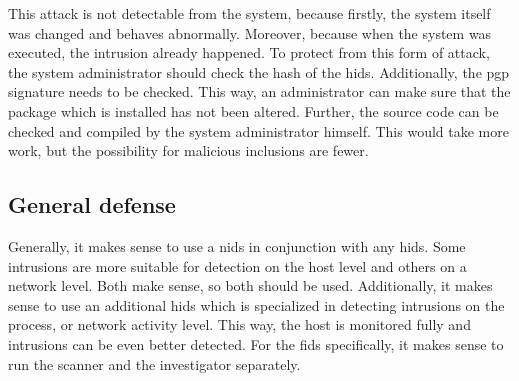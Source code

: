 This attack is not detectable from the system, because firstly, the system itself was changed and behaves abnormally. Moreover, because when the system was executed, the \gls{intrusion} already happened. To protect from this form of attack, the system administrator should check the hash of the \gls{hids}. Additionally, the \gls{pgp} signature needs to be checked. This way, an administrator can make sure that the package which is installed has not been altered. Further, the source code can be checked and compiled by the system administrator himself. This would take more work, but the possibility for malicious inclusions are fewer. 

\subsection{General defense}
\label{sec:defense:general}

Generally, it makes sense to use a \gls{nids} in conjunction with any \gls{hids}. Some \glspl{intrusion} are more suitable for detection on the host level and others on a network level. Both make sense, so both should be used. Additionally, it makes sense to use an additional \gls{hids} which is specialized in detecting \glspl{intrusion} on the process, or network activity level. This way, the host is monitored fully and \glspl{intrusion} can be even better detected. For the \gls{fids}  specifically, it makes sense to run the scanner and the investigator separately.
